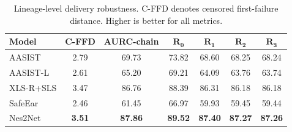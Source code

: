 \begin{table}[t]
\centering
\footnotesize
\setlength{\tabcolsep}{4pt}
\renewcommand{\arraystretch}{1.02}
\caption{Lineage-level delivery robustness. C-FFD denotes censored first-failure distance. Higher is better for all metrics.}
\label{tab:exp_delivery}
\vspace{-0.5em}
\begin{tabular*}{0.96\linewidth}{@{\extracolsep{\fill}}lcccccc@{}}
\toprule
\textbf{Model} & \textbf{C-FFD} & \textbf{AURC-chain} & \textbf{$\bm{R_0}$} & \textbf{$\bm{R_1}$} & \textbf{$\bm{R_2}$} & \textbf{$\bm{R_3}$} \\
\midrule
AASIST     & 2.79 & 69.73 & 73.82 & 68.60 & 68.25 & 68.24 \\
AASIST-L   & 2.61 & 65.20 & 69.21 & 64.09 & 63.76 & 63.74 \\
XLS-R+SLS  & 3.47 & 86.76 & 88.39 & 86.31 & 86.18 & 86.18 \\
SafeEar    & 2.46 & 61.45 & 66.97 & 59.93 & 59.45 & 59.44 \\
Nes2Net    & \textbf{3.51} & \textbf{87.86} & \textbf{89.52} & \textbf{87.40} & \textbf{87.27} & \textbf{87.26} \\
\bottomrule
\end{tabular*}
\end{table}


